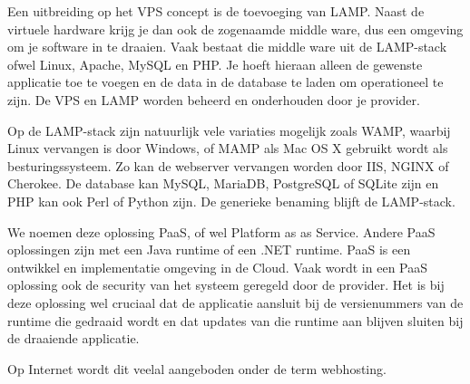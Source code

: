 Een uitbreiding op het VPS concept is de toevoeging van LAMP. Naast de virtuele hardware krijg je dan ook de zogenaamde middle ware, dus een omgeving om je software in te draaien. Vaak bestaat die middle ware uit de LAMP-stack ofwel Linux, Apache, MySQL en PHP. Je hoeft hieraan alleen de gewenste applicatie toe te voegen en de data in de database te laden om operationeel te zijn. De VPS en LAMP worden beheerd en onderhouden door je provider.

Op de LAMP-stack zijn natuurlijk vele variaties mogelijk zoals WAMP, waarbij Linux vervangen is door Windows, of MAMP als Mac OS X gebruikt wordt als besturingssysteem. Zo kan de webserver vervangen worden door IIS, NGINX of Cherokee. De database kan MySQL, MariaDB, PostgreSQL of SQLite zijn en PHP kan ook Perl of Python zijn. De generieke benaming blijft de LAMP-stack.

We noemen deze oplossing PaaS, of wel Platform as as Service. Andere PaaS oplossingen zijn met een Java runtime of een .NET runtime. PaaS is een ontwikkel en implementatie omgeving in de Cloud. Vaak wordt in een PaaS oplossing ook de security van het systeem geregeld door de provider. Het is bij deze oplossing wel cruciaal dat de applicatie aansluit bij de versienummers van de runtime die gedraaid wordt en dat updates van die runtime aan blijven sluiten bij de draaiende applicatie.

Op Internet wordt dit veelal aangeboden onder de term webhosting.
